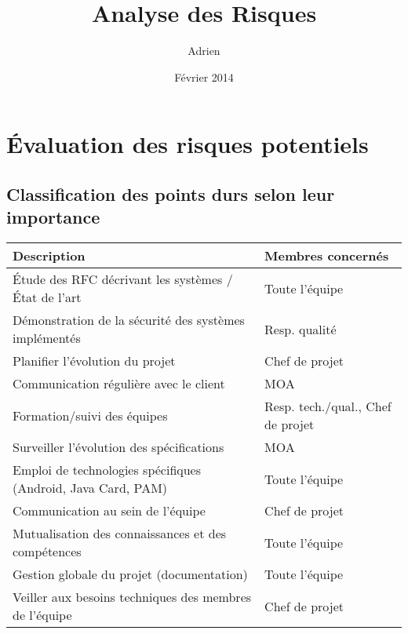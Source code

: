 \documentclass{../../res/univ-projet}
\title{Analyse des Risques}
\author{Adrien \bsc{Smondack}}
\date{Février 2014}
\begin{document}
\maketitle

\section{\'Evaluation des risques potentiels}
\subsection{Classification des points durs selon leur importance}
\begin{tabular}{| p{9cm} | p{5cm} |} 
	\hline
	\cellcolor{gray} Description & \cellcolor{gray} Membres concernés \\ \hline
	\'Etude des RFC décrivant les systèmes / \'Etat de l'art & Toute l'équipe \\ \hline
	Démonstration de la sécurité des systèmes implémentés & Resp. qualité \\ \hline
	Planifier l'évolution du projet & Chef de projet \\ \hline
	Communication régulière avec le client & MOA \\ \hline
	Formation/suivi des équipes & Resp. tech./qual., Chef de projet \\ \hline
	Surveiller l'évolution des spécifications & MOA \\ \hline
	Emploi de technologies spécifiques (Android, Java Card, PAM) & Toute l'équipe \\ \hline
	Communication au sein de l'équipe & Chef de projet \\ \hline
	Mutualisation des connaissances et des compétences & Toute l'équipe \\ \hline
	Gestion globale du projet (documentation) & Toute l'équipe\\ \hline
	Veiller aux besoins techniques des membres de l'équipe & Chef de projet \\ \hline
\end{tabular}

\end{document}
